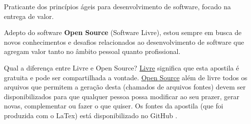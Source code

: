 Praticante dos princípios ágeis para desenvolvimento de software, focado na entrega de valor.

Adepto do software \textbf{Open Source} (Software Livre), estou sempre em busca de novos conhecimentos e desafios relacionados ao desenvolvimento de software que agregam valor tanto no âmbito pessoal quanto profissional. 


Qual a diferença entre Livre e Open Source? \underline{Livre} significa que esta apostila é gratuita e pode ser compartilhada a vontade. \underline{Open Source} além de livre todos os arquivos que permitem a geração desta (chamados de arquivos fontes) devem ser disponibilizados para que qualquer pessoa possa modificar ao seu prazer, gerar novas, complementar ou fazer o que quiser. Os fontes da apostila (que foi produzida com o LaTex) está disponibilizado no GitHub \cite{github}.